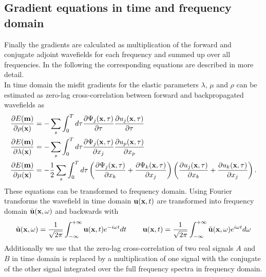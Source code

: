 \subsection{Gradient equations in time and frequency domain}
Finally the gradients are calculated as multiplication of the forward and conjugate adjoint wavefields for each frequency and summed up over all frequencies. In the following the corresponding equations are described in more detail.\\
In time domain the misfit gradients for the elastic parameters $\lambda$, $\mu$ and $\rho$ can be estimated as zero-lag cross-correlation between forward and backpropagated wavefields as \citep[e.g.][]{Mor87,But15}
\begin{equation}
\begin{split}
 \frac{\partial E(\textbf m)}{\partial\rho(\textbf x)} & =-\sum_{s}\int_0^T d\tau \frac{\partial\Psi_j(\textbf x,\tau)}{\partial\tau}\frac{\partial u_j(\textbf x,\tau)}{\partial\tau}
\\
\frac{\partial E(\textbf m)}{\partial\lambda(\textbf x)} & =-\sum_{s}\int_0^T d\tau \frac{\partial\Psi_j(\textbf x,\tau)}{\partial x_j}\frac{\partial u_p(\textbf x,\tau)}{\partial x_p}
\\
 \frac{\partial E(\textbf m)}{\partial\mu(\textbf x)} & =-\frac{1}{2}\sum_{s}\int_0^T d\tau \left (\frac{\partial\Psi_j(\textbf x,\tau)}{\partial x_k}+\frac{\partial\Psi_k(\textbf x,\tau)}{\partial x_j}\right )\left (\frac{\partial u_j(\textbf x,\tau)}{\partial x_k}+\frac{\partial u_k(\textbf x,\tau)}{\partial x_j}\right ).
\end{split}\label{equ:grad3}
\end{equation}
These equations can be transformed to frequency domain. Using Fourier transforms the wavefield in time domain $\textbf u(\textbf x,t)$ are transformed into frequency domain  $\tilde{\textbf u}(\textbf x,\omega)$ and backwards with
\begin{equation}
 \tilde{\textbf u}(\textbf x,\omega)=\frac{1}{\sqrt{2\pi}}\int_{-\infty}^{+\infty} \textbf u(\textbf x,t)e^{-i\omega t} dt  \hspace{0.8cm}  
 \textbf u(\textbf x,t)= \frac{1}{\sqrt{2\pi}}\int_{-\infty}^{+\infty}\tilde{\textbf u}(\textbf x,\omega)  e^{i\omega t} d\omega  \label{equ:fourier1}   \end{equation}
Additionally we use that the zero-lag cross-correlation of two real signals $A$ and $B$ in time domain is replaced by a multiplication of one signal with the conjugate of the other signal integrated over the full frequency spectra in frequency domain.
